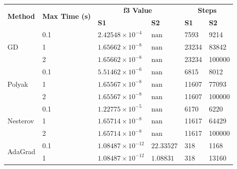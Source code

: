 \documentclass[9pt]{IEEEtran}
\begin{document}
\begin{table}[h!]
    \centering
    \begin{tabular}{|p{1cm}|p{1.9cm}|p{1.2cm}|p{1.2cm}|p{0.7cm}|p{0.7cm}|}
        \hline
        \multirow{2}{*}{\textbf{Method}} & \multirow{2}{*}{\textbf{Max Time (s)}} & \multicolumn{2}{c|}{\textbf{f3 Value}} & \multicolumn{2}{c|}{\textbf{Steps}} \\ \cline{3-6} 
                                         &                                      & \textbf{S1} & \textbf{S2} & \textbf{S1} & \textbf{S2} \\ \hline
        \multirow{3}{*}{GD} 
                                         & 0.1   & $2.42548\times10^{-4}$   & $\text{nan}$          & 7593   & 9214 \\ \cline{2-6} 
                                         & 1     & $1.65662\times10^{-8}$   & $\text{nan}$          & 23234  & 83842 \\ \cline{2-6} 
                                         & 2     & $1.65662\times10^{-8}$   & $\text{nan}$          & 23234  & 100000 \\ \hline
        \multirow{3}{*}{Polyak} 
                                         & 0.1   & $5.51462\times10^{-6}$   & $\text{nan}$          & 6815   & 8012 \\ \cline{2-6} 
                                         & 1     & $1.65567\times10^{-8}$   & $\text{nan}$          & 11607  & 77093 \\ \cline{2-6} 
                                         & 2     & $1.65567\times10^{-8}$   & $\text{nan}$          & 11607  & 100000 \\ \hline
        \multirow{3}{*}{Nesterov} 
                                         & 0.1   & $1.22775\times10^{-5}$   & $\text{nan}$          & 6170   & 6220 \\ \cline{2-6} 
                                         & 1     & $1.65714\times10^{-8}$   & $\text{nan}$          & 11617  & 64429 \\ \cline{2-6} 
                                         & 2     & $1.65714\times10^{-8}$   & $\text{nan}$          & 11617  & 100000 \\ \hline
        \multirow{3}{*}{AdaGrad} 
                                         & 0.1   & $1.08487\times10^{-12}$  & $22.33527$           & 318    & 1168 \\ \cline{2-6} 
                                         & 1     & $1.08487\times10^{-12}$  & $1.08831$            & 318    & 13160 \\ \cline{2-6} 

\end{tabular}
\end{table}
\end{document}
